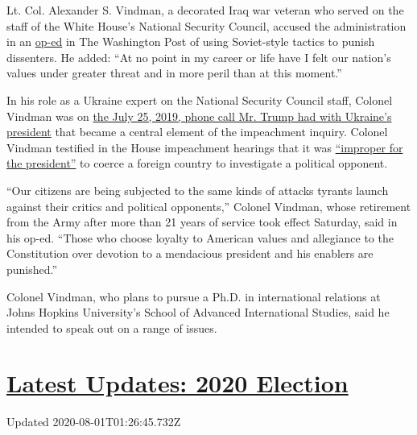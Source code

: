 Lt. Col. Alexander S. Vindman, a decorated Iraq war veteran who served
on the staff of the White House's National Security Council, accused the
administration in an
\href{https://www.washingtonpost.com/opinions/2020/08/01/alexander-vindman-retiring-oped/?hpid=hp_save-opinions-float-right-4-0_opinion-card-a-right\%3Ahomepage\%2Fstory-ans}{op-ed}
in The Washington Post of using Soviet-style tactics to punish
dissenters. He added: ``At no point in my career or life have I felt our
nation's values under greater threat and in more peril than at this
moment.''

In his role as a Ukraine expert on the National Security Council staff,
Colonel Vindman was on
\href{https://www.nytimes.com/interactive/2019/09/25/us/politics/trump-ukraine-transcript.html}{the
July 25, 2019, phone call Mr. Trump had with Ukraine's president} that
became a central element of the impeachment inquiry. Colonel Vindman
testified in the House impeachment hearings that it was
\href{https://www.nytimes.com/2019/11/19/us/politics/impeachment-hearings.html}{``improper
for the president''} to coerce a foreign country to investigate a
political opponent.

``Our citizens are being subjected to the same kinds of attacks tyrants
launch against their critics and political opponents,'' Colonel Vindman,
whose retirement from the Army after more than 21 years of service took
effect Saturday, said in his op-ed. ``Those who choose loyalty to
American values and allegiance to the Constitution over devotion to a
mendacious president and his enablers are punished.''

Colonel Vindman, who plans to pursue a Ph.D. in international relations
at Johns Hopkins University's School of Advanced International Studies,
said he intended to speak out on a range of issues.

\hypertarget{latest-updates-2020-election}{%
\section{\texorpdfstring{\href{https://www.nytimes.com/2020/07/31/us/elections/biden-vs-trump.html?action=click\&pgtype=Article\&state=default\&region=MAIN_CONTENT_1\&context=storylines_live_updates}{Latest
Updates: 2020
Election}}{Latest Updates: 2020 Election}}\label{latest-updates-2020-election}}

Updated 2020-08-01T01:26:45.732Z

